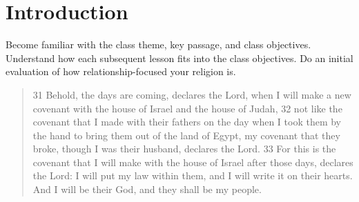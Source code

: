 
\section{Introduction}

\begin{goals}
\goal Become familiar with the class theme, key passage, and class objectives.
\goal Understand how each subsequent lesson fits into the class objectives.
\goal Do an initial evaluation of how relationship-focused your religion is.
\end{goals}

\begin{frame}
\begin{quote}
31 Behold, the days are coming, declares the Lord, when I will make a new covenant with the house of Israel and the house of Judah, 32 not like the covenant that I made with their fathers on the day when I took them by the hand to bring them out of the land of Egypt, my covenant that they broke, though I was their husband, declares the Lord. 33 For this is the covenant that I will make with the house of Israel after those days, declares the Lord: I will put my law within them, and I will write it on their hearts. And I will be their God, and they shall be my people. 
\end{quote}
\end{frame}

%
%
%
%
%
%
%
%
%
%

